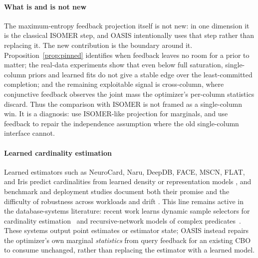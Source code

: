 \documentclass[preprint,12pt]{elsarticle}
\begin{document}
\paragraph{What is and is not new}
The maximum-entropy feedback projection itself is not new: in one dimension it is the
classical ISOMER step, and OASIS intentionally uses that step rather than replacing it. The
new contribution is the boundary around it. Proposition~\ref{prop:pinned} identifies when
feedback leaves no room for a prior to matter; the real-data experiments show that even below
full saturation, single-column priors and learned fits do not give a stable edge over the
least-committed completion; and the remaining exploitable signal is cross-column, where
conjunctive feedback observes the joint mass the optimizer's per-column statistics discard.
Thus the comparison with ISOMER is not framed as a single-column win. It is a diagnosis:
use ISOMER-like projection for marginals, and use feedback to repair the independence
assumption where the old single-column interface cannot.

\paragraph{Learned cardinality estimation}
Learned estimators such as NeuroCard, Naru, DeepDB, FACE, MSCN, FLAT, and Iris predict
cardinalities from learned density or representation models
\cite{yang2020neurocard,yang2019deep,hilprecht2019deepdb,yang2020face,kipf2019learned,zhu2021flat,lu2022pretraining},
and benchmark and deployment studies document both their promise and the difficulty of
robustness across workloads and drift
\cite{wang2021ready,sun2021designspace,kim2022learnedstudy,han2021cardinality,li2022warper,negi2023robust,li2023alece,wang2023ceda,wang2023ldss,han2024bytecard}.
This line remains active in the database-systems literature: recent work learns dynamic sample selectors for
cardinality estimation~\cite{wang2023dynamicsample} and recursive-network models of complex
predicates~\cite{wang2024recursivepred}. These systems output point estimates or estimator
state; OASIS instead repairs the optimizer's own marginal \emph{statistics} from query feedback
for an existing CBO to consume unchanged, rather than replacing the estimator with a learned
model.
\end{document}
